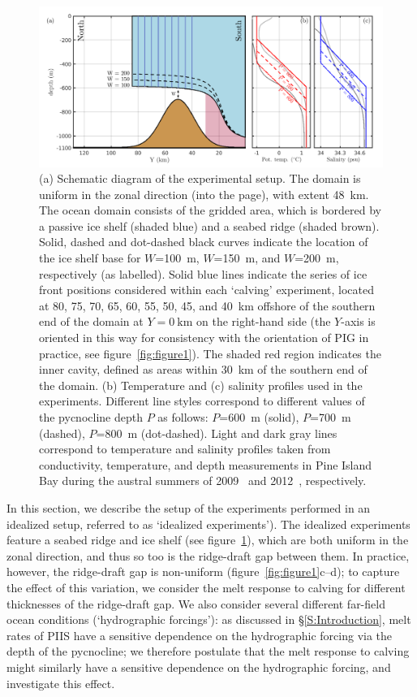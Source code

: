 \documentclass[draft]{agujournal2019}
\begin{document}
\begin{figure}
    \centering
    \includegraphics[width = \textwidth]{../make_figures/plots/figure2.pdf}
    \caption{(a) Schematic diagram of the experimental setup. The domain is uniform in the zonal direction (into the page), with extent 48~km. The ocean domain consists of the gridded area, which is bordered by a passive ice shelf (shaded blue) and a seabed ridge (shaded brown). Solid, dashed and dot-dashed black curves indicate the location of the ice shelf base for $W$=100~m, $W$=150~m, and $W$=200~m, respectively (as labelled). Solid blue lines indicate the series of ice front positions considered within each `calving' experiment, located at 80, 75, 70, 65, 60, 55, 50, 45, and 40~km offshore of the southern end of the domain at $Y = 0~\text{km}$ on the right-hand side (the $Y$-axis is oriented in this way for consistency with the orientation of PIG in practice, see figure~\ref{fig:figure1}). The shaded red region indicates the inner cavity, defined as areas within 30~km of the southern end of the domain. (b) Temperature and (c) salinity profiles used in the experiments. Different line styles correspond to different values of the pycnocline depth $P$ as follows: $P$=600~m (solid), $P$=700~m (dashed), $P$=800~m (dot-dashed). Light and dark gray lines correspond to temperature and salinity profiles taken from conductivity, temperature, and depth measurements in Pine Island Bay during the austral summers of 2009~\cite{Jacobs2011NatureGeosci} and 2012~\cite{Dutrieux2014Science}, respectively.}
    \label{fig:figure2}
\end{figure}

In this section, we describe the setup of the experiments performed in an idealized setup, referred to as `idealized experiments'). The idealized experiments feature a seabed ridge and ice shelf (see figure~\ref{fig:figure2}), which are both uniform in the zonal direction, and thus so too is the ridge-draft gap between them. In practice, however, the ridge-draft gap is non-uniform (figure~\ref{fig:figure1}c--d); to capture the effect of this variation, we consider the melt response to calving for different thicknesses of the ridge-draft gap. We also consider several different far-field ocean conditions (`hydrographic forcings'): as discussed in \S\ref{S:Introduction}, melt rates of PIIS have a sensitive dependence on the hydrographic forcing via the depth of the pycnocline; we therefore postulate that the melt response to calving might similarly have a sensitive dependence on the hydrographic forcing, and investigate this effect.
\end{document}
